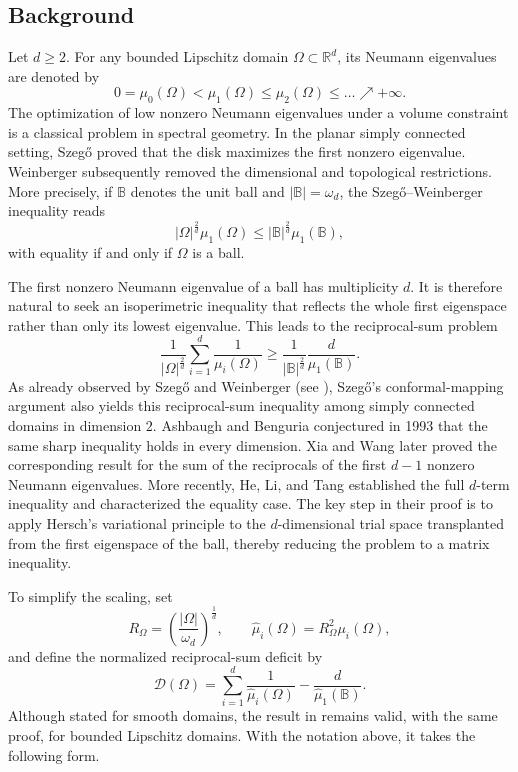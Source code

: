\documentclass{amsart}
\numberwithin{equation}{section}
\theoremstyle{plain}
\theoremstyle{definition}
\theoremstyle{plain}
\theoremstyle{remark}
\numberwithin{figure}{section}
\newcommand{\B}{\mathbb{B}}
\newcommand{\muu}{\widehat{\mu}}
\newcommand{\D}{\mathcal{D}(\Omega)}
\begin{document}
\subsection{Background}
Let $d\geq 2$. For any bounded Lipschitz domain $\Omega\subset\mathbb{R}^d$, its Neumann eigenvalues are denoted by
\[
    0=\mu_0(\Omega)<\mu_1(\Omega)\leq\mu_2(\Omega)\leq\dots\nearrow +\infty.
\]
The optimization of low nonzero Neumann eigenvalues under a volume constraint is a classical problem in spectral geometry. In the planar simply connected setting, Szeg\H{o} \cite{Sze54} proved that the disk maximizes the first nonzero eigenvalue. Weinberger \cite{Wein56} subsequently removed the dimensional and topological restrictions. More precisely, if $\B$ denotes the unit ball and $|\B|=\omega_d$, the Szeg\H{o}--Weinberger inequality reads
\[
    |\Omega|^{\frac{2}{d}}\mu_1(\Omega)\leq |\B|^{\frac{2}{d}}\mu_1(\B),
\]
with equality if and only if $\Omega$ is a ball.

The first nonzero Neumann eigenvalue of a ball has multiplicity $d$. It is therefore natural to seek an isoperimetric inequality that reflects the whole first eigenspace rather than only its lowest eigenvalue. This leads to the reciprocal-sum problem
\[
    \frac{1}{|\Omega|^{\frac{2}{d}}}\sum_{i=1}^d\frac{1}{\mu_i(\Omega)}\geq \frac{1}{|\B|^{\frac{2}{d}}}\frac{d}{\mu_1(\B)}.
\]
As already observed by Szeg\H{o} and Weinberger (see \cite[p. 634]{Wein56}), Szeg\H{o}'s conformal-mapping argument also yields this reciprocal-sum inequality among simply connected domains in dimension $2$. Ashbaugh and Benguria \cite{AB93N} conjectured in 1993 that the same sharp inequality holds in every dimension. Xia and Wang \cite{XW23} later proved the corresponding result for the sum of the reciprocals of the first $d-1$ nonzero Neumann eigenvalues. More recently, He, Li, and Tang \cite{HLT26+} established the full $d$-term inequality and characterized the equality case. The key step in their proof is to apply Hersch's variational principle to the $d$-dimensional trial space transplanted from the first eigenspace of the ball, thereby reducing the problem to a matrix inequality.

To simplify the scaling, set
\begin{equation}
    \label{eq:notationmuu}
    R_\Omega=\left(\frac{|\Omega|}{\omega_d}\right)^{\frac{1}{d}},\qquad \muu_i(\Omega)=R_\Omega^2\mu_i(\Omega),
\end{equation}
and define the normalized reciprocal-sum deficit by
\begin{equation}
    \label{eq:notationD}
    \D=\sum_{i=1}^d\frac{1}{\muu_i(\Omega)}-\frac{d}{\muu_1(\B)}.
\end{equation}
Although stated for smooth domains, the result in \cite{HLT26+} remains valid, with the same proof, for bounded Lipschitz domains. With the notation above, it takes the following form.
\end{document}

